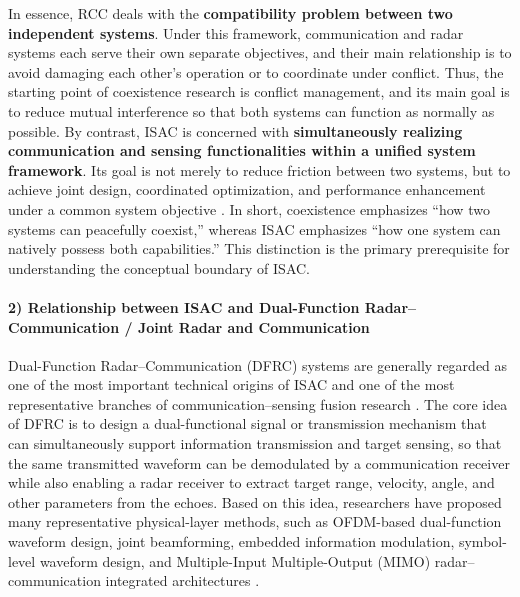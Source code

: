 In essence, RCC deals with the \textbf{compatibility problem between two independent systems}. Under this framework, communication and radar systems each serve their own separate objectives, and their main relationship is to avoid damaging each other's operation or to coordinate under conflict. Thus, the starting point of coexistence research is conflict management, and its main goal is to reduce mutual interference so that both systems can function as normally as possible. By contrast, ISAC is concerned with \textbf{simultaneously realizing communication and sensing functionalities within a unified system framework}. Its goal is not merely to reduce friction between two systems, but to achieve joint design, coordinated optimization, and performance enhancement under a common system objective \cite{Liu2022ISAC}. In short, coexistence emphasizes ``how two systems can peacefully coexist,'' whereas ISAC emphasizes ``how one system can natively possess both capabilities.'' This distinction is the primary prerequisite for understanding the conceptual boundary of ISAC.

\paragraph{2) Relationship between ISAC and Dual-Function Radar--Communication / Joint Radar and Communication}

Dual-Function Radar--Communication (DFRC) systems are generally regarded as one of the most important technical origins of ISAC and one of the most representative branches of communication--sensing fusion research \cite{Hassanien2015dual,Liu2020JointRadarComm}. The core idea of DFRC is to design a dual-functional signal or transmission mechanism that can simultaneously support information transmission and target sensing, so that the same transmitted waveform can be demodulated by a communication receiver while also enabling a radar receiver to extract target range, velocity, angle, and other parameters from the echoes. Based on this idea, researchers have proposed many representative physical-layer methods, such as OFDM-based dual-function waveform design, joint beamforming, embedded information modulation, symbol-level waveform design, and Multiple-Input Multiple-Output (MIMO) radar--communication integrated architectures \cite{Hassanien2015dual,Zhang2021ISAC6G}.

